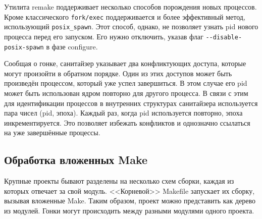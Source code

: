 Утилита remake поддерживает несколько способов порождения новых процессов. Кроме классического \texttt{fork/exec} поддерживается и более эффективный метод, использующий \texttt{posix\_spawn}. Этот способ, однако, не позволяет узнать pid нового процесса перед его запуском. Его нужно отключить, указав флаг \texttt{-{}-disable-posix-spawn} в фазе configure.

Сообщая о гонке, санитайзер указывает два конфликтующих доступа, которые могут произойти в обратном порядке. Один из этих доступов может быть произведён процессом, который уже успел завершиться. В этом случае его pid может быть использован ядром повторно для другого процесса. В связи с этим для идентификации процессов в внутренних структурах санитайзера используется пара чисел (pid, эпоха). Каждый раз, когда pid используется повторно, эпоха инкрементируется. Это позволяет избежать конфликтов и однозначно ссылаться на уже завершённые процессы.

\subsection{Обработка вложенных Make}
\label{subsec:nested-make}

Крупные проекты бывают разделены на несколько схем сборки, каждая из которых отвечает за свой модуль. <<Корневой>> Makefile запускает их сборку, вызывая вложенные Make. Таким образом, проект можно представить как дерево из модулей. Гонки могут происходить между разными модулями одного проекта.

